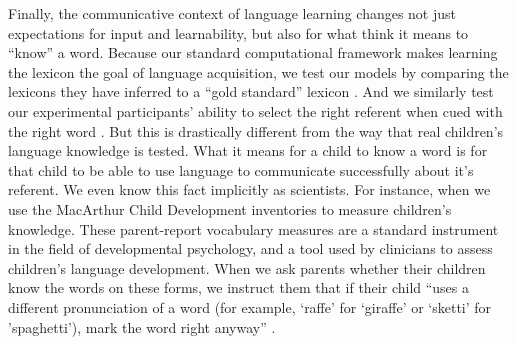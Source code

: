 \documentclass[review]{elsarticle}
\begin{document}
Finally, the communicative context of language learning changes not just expectations for input and learnability, but also for what think it means to ``know'' a word. Because our standard computational framework makes learning the lexicon the goal of language acquisition, we test our models by comparing the lexicons they have inferred to a ``gold standard'' lexicon \citep[e.g.,][]{frank2009,fazly2010,yu2008}. And we similarly test our experimental participants' ability to select the right referent when cued with the right word \citep[e.g.,][]{smith2011,yu2007,yurovsky2014}. But this is drastically different from the way that real children's language knowledge is tested. What it means for a child to know a word is for that child to be able to use language to communicate successfully about it's referent. We even know this fact implicitly as scientists. For instance, when we use the MacArthur Child Development inventories to measure children's knowledge. These parent-report vocabulary measures are a standard instrument in the field of developmental psychology, and a tool used by clinicians to assess children's language development. When we ask parents whether their children know the words on these forms, we instruct them that if their child ``uses a different pronunciation of a word (for example, `raffe' for `giraffe' or `sketti' for 'spaghetti'), mark the word right anyway'' \citep{fenson2007}.
\end{document}
